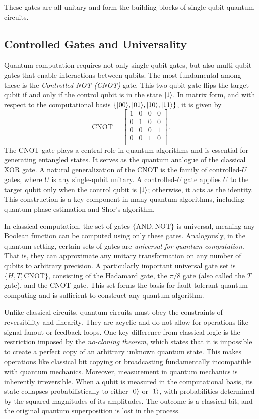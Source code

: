 \documentclass[12pt]{report}
\begin{document}
These gates are all unitary and form the building blocks of single-qubit quantum circuits.

\subsection{Controlled Gates and Universality}

Quantum computation requires not only single-qubit gates, but also multi-qubit gates that enable interactions between qubits. The most fundamental among these is the \emph{Controlled-NOT (CNOT)} gate. This two-qubit gate flips the target qubit if and only if the control qubit is in the state $\lvert1\rangle$. In matrix form, and with respect to the computational basis $\{\lvert00\rangle, \lvert01\rangle, \lvert10\rangle, \lvert11\rangle\}$, it is given by
\[
\text{CNOT} = 
\begin{bmatrix}
1 & 0 & 0 & 0 \\
0 & 1 & 0 & 0 \\
0 & 0 & 0 & 1 \\
0 & 0 & 1 & 0 \\
\end{bmatrix}.
\]
The CNOT gate plays a central role in quantum algorithms and is essential for generating entangled states. It serves as the quantum analogue of the classical XOR gate. A natural generalization of the CNOT is the family of controlled-$U$ gates, where $U$ is any single-qubit unitary. A controlled-$U$ gate applies $U$ to the target qubit only when the control qubit is $\lvert1\rangle$; otherwise, it acts as the identity. This construction is a key component in many quantum algorithms, including quantum phase estimation and Shor’s algorithm.

In classical computation, the set of gates $\{\text{AND}, \text{NOT}\}$ is universal, meaning any Boolean function can be computed using only these gates. Analogously, in the quantum setting, certain sets of gates are \emph{universal for quantum computation}. That is, they can approximate any unitary transformation on any number of qubits to arbitrary precision. A particularly important universal gate set is $\{H, T, \text{CNOT}\}$, consisting of the Hadamard gate, the $\pi/8$ gate (also called the $T$ gate), and the CNOT gate. This set forms the basis for fault-tolerant quantum computing and is sufficient to construct any quantum algorithm.

Unlike classical circuits, quantum circuits must obey the constraints of reversibility and linearity. They are acyclic and do not allow for operations like signal fanout or feedback loops. One key difference from classical logic is the restriction imposed by the \emph{no-cloning theorem}, which states that it is impossible to create a perfect copy of an arbitrary unknown quantum state. This makes operations like classical bit copying or broadcasting fundamentally incompatible with quantum mechanics. Moreover, measurement in quantum mechanics is inherently irreversible. When a qubit is measured in the computational basis, its state collapses probabilistically to either $\lvert0\rangle$ or $\lvert1\rangle$, with probabilities determined by the squared magnitudes of its amplitudes. The outcome is a classical bit, and the original quantum superposition is lost in the process.
\end{document}
